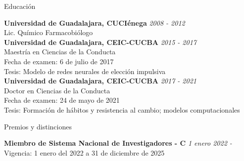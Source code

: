 \documentclass{resume} %
\begin{document}
\begin{rSection}{Educación}

{\bf Universidad de Guadalajara, CUCIénega} \hfill {\em 2008 - 2012} \\ 
Lic. Químico Farmacobiólogo \\
{\bf Universidad de Guadalajara, CEIC-CUCBA} \hfill {\em 2015 - 2017} \\ 
Maestría en Ciencias de la Conducta \\
Fecha de examen: 6 de julio de 2017\\
Tesis: Modelo de redes neurales de elección impulsiva \\
{\bf Universidad de Guadalajara, CEIC-CUCBA} \hfill {\em 2017 - 2021} \\
Doctor en Ciencias de la Conducta \\
Fecha de examen: 24 de mayo de 2021\\
Tesis: Formación de hábitos y resistencia al cambio; modelos computacionales

\end{rSection}

\begin{rSection}{Premios y distinciones}

{\bf Miembro de Sistema Nacional de Investigadores - C} \hfill {\em 1 enero 2022 - }\\
Vigencia: 1 enero del 2022 a 31 de diciembre de 2025

\end{rSection}
\end{document}
